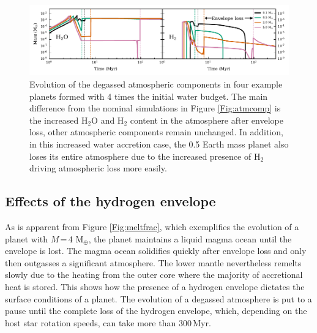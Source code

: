 \documentclass[bibyear,tradiabstract]{aa}
\begin{document}
\begin{figure}
\centering
\includegraphics[width=18cm]{atmcomparisons_4xh2oshort.pdf}
   \caption{{Evolution of the degassed atmospheric components in four example planets formed with 4 times the initial water budget. The main difference from the nominal simulations in Figure \ref{Fig:atmcomp} is the increased H$_2$O and H$_2$ content in the atmosphere after envelope loss, other atmospheric components remain unchanged. In addition, in this increased water accretion case, the 0.5 Earth mass planet also loses its entire atmosphere due to the increased presence of H$_2$ driving atmospheric loss more easily.
   }}
      \label{Fig:atmcomp_4xh2o}
\end{figure}
\subsection{Effects of the hydrogen envelope}
As is apparent from Figure \ref{Fig:meltfrac}, which exemplifies the evolution of a planet with $M$\,=\,4 M$_{\oplus}$, the planet maintains a liquid magma ocean until the envelope is lost. The magma ocean solidifies quickly after envelope loss and only then outgasses a significant atmosphere. The lower mantle nevertheless remelts slowly due to the heating from the outer core where the majority of accretional heat is stored. This shows how the presence of a hydrogen envelope dictates the surface conditions of a planet. The evolution of a degassed atmosphere is put to a pause until the complete loss of the hydrogen envelope, which, depending on the host star rotation speeds, can take more than 300\,Myr. 
\end{document}
